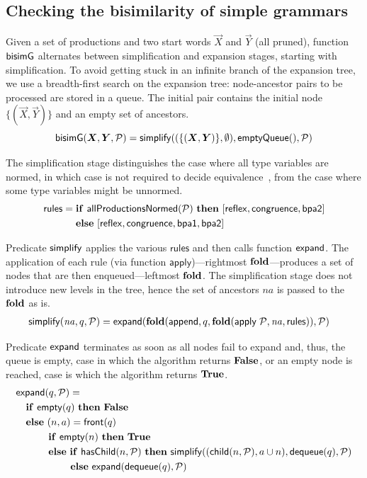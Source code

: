 \subsection{Checking the bisimilarity of simple grammars}

Given a set of productions and two start words $\vec X$ and $\vec Y$
(all pruned), function $\mathsf{bisimG}$ alternates between simplification and
expansion stages, starting with simplification.
%
To avoid getting stuck in an infinite branch of the expansion tree, we
use a breadth-first search on the expansion tree: node-ancestor pairs
to be processed are stored in a queue. The initial pair contains the
initial node $\{(\vec X,\vec Y)\}$ and an empty set of ancestors.
%
\begin{equation*}
  \Bisim(\vec X, \vec Y, \productions) = \simplify((\{(\vec X,\vec Y)\},\emptyset), \mathsf{emptyQueue()}, 
  \productions)
\end{equation*}

The simplification stage distinguishes the case where all type
variables are normed, in which case  is not required to decide
equivalence~\cite{caucal1986decidabilite,DBLP:journals/iandc/ChristensenHS95},
from the case where some type variables might be unnormed.
%
\begin{align*}
  \mathsf{rules} =\;& \If\ \mathsf{allProductionsNormed(\productions)}\ \Then\
  [\mathsf{reflex} ,\mathsf{congruence}, \mathsf{bpa2}]\\
  &\Else\ [\mathsf{reflex} ,\mathsf{congruence}, \mathsf{bpa1} , \mathsf{bpa2}]
\end{align*}

Predicate $\mathsf{simplify}$ applies the various $\mathsf{rules}$ and then
calls function $\mathsf{expand}$.
%
The application of each rule (via function
$\mathsf{apply}$)---rightmost $\mathbf{fold}$---produces a set of nodes that
are then enqueued---leftmost $\mathbf{fold}$.
%
The simplification stage does not introduce new levels in the tree,
hence the set of ancestors $\mathit{na}$ is passed to the $\mathbf{fold}$ as
is.
%
\begin{align*}
  &\mathsf{simplify}(\mathit{na}, q, \mathcal P) = \mathsf{expand}(\mathbf{fold}(\mathsf{append}, q,
    \mathbf{fold}(\mathsf{apply} \; \mathcal P, \mathit{na},
    \mathsf{rules})), \mathcal P)
\end{align*}

Predicate $\mathsf{expand}$ terminates as soon as all nodes fail to expand
and, thus, the queue is empty, case in which the algorithm returns
$\mathbf{False}$, or an empty node is reached, case is which the algorithm
returns $\mathbf{True}$.
%
\begin{align*}
  &\expand(q, \productions) =\\
  &\quad \If\ \mathsf{empty}(q)\ \Then\ \False\\
  &\quad \Else\ (n,a) = \mathsf{front}(q)\\
  & \qquad\quad\; \If\ \mathsf{empty}(n)\ \Then\ \True\\
  & \qquad\quad\; \Else\ \If\ \mathsf{hasChild}(n, \productions)\ \Then\
    \simplify((\mathsf{child}(n, \productions), a \cup n), \mathsf{dequeue}(q), \productions)\\
  & \qquad\qquad\quad\;\: \Else\ \expand(\mathsf{dequeue}(q), \productions)
\end{align*}

